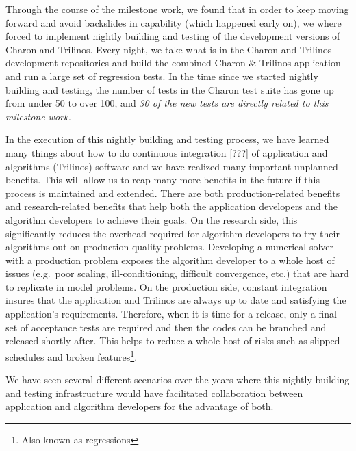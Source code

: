 \documentclass[pdf,ps2pdf,11pt]{SANDreport}
\begin{document}
Through the course of the milestone work, we found that in order to keep
moving forward and avoid backslides in capability (which happened early on),
we where forced to implement nightly building and testing of the development
versions of Charon and Trilinos.  Every night, we take what is in the Charon
and Trilinos development repositories and build the combined Charon \&
Trilinos application and run a large set of regression tests.  In the time
since we started nightly building and testing, the number of tests in the
Charon test suite has gone up from under 50 to over 100, and {\em 30 of the
new tests are directly related to this milestone work.}

In the execution of this nightly building and testing process, we have learned
many things about how to do continuous integration [???] of application and
algorithms (Trilinos) software and we have realized many important unplanned
benefits.  This will allow us to reap many more benefits in the future if this process is maintained
and extended.  There are both production-related benefits and research-related
benefits that help both the application developers and the algorithm
developers to achieve their goals.  On the research side, this significantly
reduces the overhead required for algorithm developers to try their algorithms
out on production quality problems.  Developing a numerical solver with a
production problem exposes the algorithm developer to a whole host of issues
(e.g.\ poor scaling, ill-conditioning, difficult convergence, etc.) that are
hard to replicate in model problems.  On the production side, constant
integration insures that the application and Trilinos are always up to date
and satisfying the application's requirements.  Therefore, when it is time for
a release, only a final set of acceptance tests are required and then the
codes can be branched and released shortly after.  This helps to reduce a
whole host of risks such as slipped schedules and broken
features\footnote{Also known as regressions}.



We have seen several different scenarios over the years where this nightly
building and testing infrastructure would have facilitated collaboration
between application and algorithm developers for the advantage of both.
\end{document}
